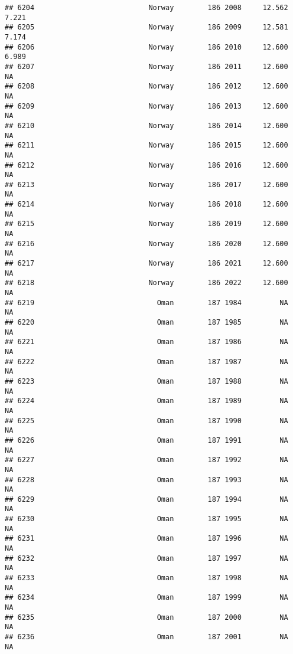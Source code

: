 \documentclass[
]{article}
\begin{document}
\begin{verbatim}
## 6204                           Norway        186 2008     12.562      7.221
## 6205                           Norway        186 2009     12.581      7.174
## 6206                           Norway        186 2010     12.600      6.989
## 6207                           Norway        186 2011     12.600         NA
## 6208                           Norway        186 2012     12.600         NA
## 6209                           Norway        186 2013     12.600         NA
## 6210                           Norway        186 2014     12.600         NA
## 6211                           Norway        186 2015     12.600         NA
## 6212                           Norway        186 2016     12.600         NA
## 6213                           Norway        186 2017     12.600         NA
## 6214                           Norway        186 2018     12.600         NA
## 6215                           Norway        186 2019     12.600         NA
## 6216                           Norway        186 2020     12.600         NA
## 6217                           Norway        186 2021     12.600         NA
## 6218                           Norway        186 2022     12.600         NA
## 6219                             Oman        187 1984         NA         NA
## 6220                             Oman        187 1985         NA         NA
## 6221                             Oman        187 1986         NA         NA
## 6222                             Oman        187 1987         NA         NA
## 6223                             Oman        187 1988         NA         NA
## 6224                             Oman        187 1989         NA         NA
## 6225                             Oman        187 1990         NA         NA
## 6226                             Oman        187 1991         NA         NA
## 6227                             Oman        187 1992         NA         NA
## 6228                             Oman        187 1993         NA         NA
## 6229                             Oman        187 1994         NA         NA
## 6230                             Oman        187 1995         NA         NA
## 6231                             Oman        187 1996         NA         NA
## 6232                             Oman        187 1997         NA         NA
## 6233                             Oman        187 1998         NA         NA
## 6234                             Oman        187 1999         NA         NA
## 6235                             Oman        187 2000         NA         NA
## 6236                             Oman        187 2001         NA         NA

\end{verbatim}
\end{document}
